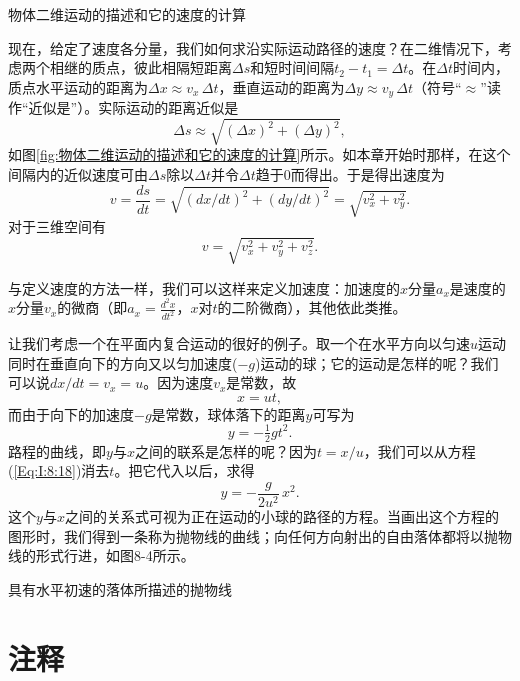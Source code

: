 \documentclass[12pt,oneside]{book}
\begin{document}
\begin{common-format}
\vspace{20pt}
\begin{fig}{物体二维运动的描述和它的速度的计算}
\caption{物体二维运动的描述和它的速度的计算}
\label{fig:物体二维运动的描述和它的速度的计算}
\end{fig}
现在，给定了速度各分量，我们如何求沿实际运动路径的速度？在二维情况下，考虑两个相继的质点，彼此相隔短距离$\Delta s$和短时间间隔$t_2-t_1=\Delta t$。在$\Delta t$时间内，质点水平运动的距离为$\Delta x\approx v_x\,\Delta t$，垂直运动的距离为$\Delta y\approx v_y\,\Delta t$（符号“$\approx$”读作“近似是”）。实际运动的距离近似是
\begin{equation}
\label{Eq:I:8:14}
\Delta s\approx\sqrt{(\Delta x)^2+(\Delta y)^2},
\end{equation}
如图\ref{fig:物体二维运动的描述和它的速度的计算}所示。如本章开始时那样，在这个间隔内的近似速度可由$\Delta s$除以$\Delta t$并令$\Delta t$趋于0而得出。于是得出速度为
\begin{equation}
\label{Eq:I:8:15}
v=\frac{ds}{dt}=\sqrt{(dx/dt)^2+(dy/dt)^2}=\sqrt{v_x^2+v_y^2}.
\end{equation}
对于三维空间有
\begin{equation}
\label{Eq:I:8:16}
v=\sqrt{v_x^2+v_y^2+v_z^2}.
\end{equation}

与定义速度的方法一样，我们可以这样来定义加速度：加速度的$x$分量$a_x$是速度的$x$分量$v_x$的微商（即$a_x=\frac{d^2x}{dt^2}$，$x$对$t$的二阶微商），其他依此类推。

让我们考虑一个在平面内复合运动的很好的例子。取一个在水平方向以匀速$u$运动同时在垂直向下的方向又以匀加速度($-g$)运动的球；它的运动是怎样的呢？我们可以说$dx/dt=v_x=u$。因为速度$v_x$是常数，故
\begin{equation}
\label{Eq:I:8:17}
x=ut,
\end{equation}
而由于向下的加速度$-g$是常数，球体落下的距离$y$可写为
\begin{equation}
\label{Eq:I:8:18}
y=-\tfrac{1}{2}gt^2.
\end{equation}
路程的曲线，即$y$与$x$之间的联系是怎样的呢？因为$t=x/u$，我们可以从方程(\ref{Eq:I:8:18})消去$t$。把它代入以后，求得
\begin{equation}
\label{Eq:I:8:19}
y=-\frac{g}{2u^2}\,x^2.
\end{equation}
这个$y$与$x$之间的关系式可视为正在运动的小球的路径的方程。当画出这个方程的图形时，我们得到一条称为抛物线的曲线；向任何方向射出的自由落体都将以抛物线的形式行进，如图8-4所示。 

\begin{fig}{具有水平初速的落体所描述的抛物线}
\caption{具有水平初速的落体所描述的抛物线}
\label{fig:具有水平初速的落体所描述的抛物线}
\end{fig}


\section{注释}
\showendnotes


\end{common-format}
\end{document}
